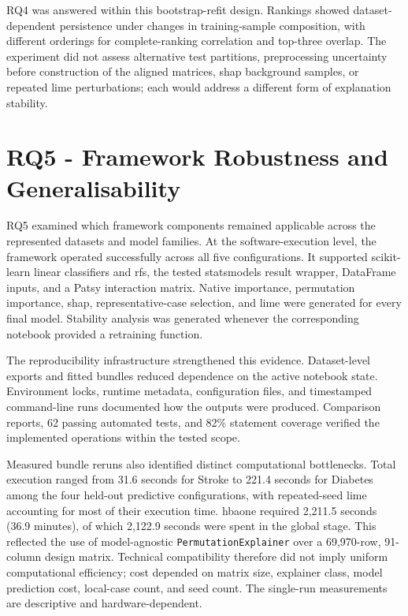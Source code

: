 RQ4 was answered within this bootstrap-refit design. Rankings showed dataset-dependent persistence under changes in training-sample composition, with different orderings for complete-ranking correlation and top-three overlap. The experiment did not assess alternative test partitions, preprocessing uncertainty before construction of the aligned matrices, \gls{shap} background samples, or repeated \gls{lime} perturbations; each would address a different form of explanation stability.

\section{RQ5 - Framework Robustness and Generalisability}

RQ5 examined which framework components remained applicable across the represented datasets and model families. At the software-execution level, the framework operated successfully across all five configurations. It supported scikit-learn linear classifiers and \glspl{rf}, the tested statsmodels result wrapper, DataFrame inputs, and a Patsy interaction matrix. Native importance, permutation importance, \gls{shap}, representative-case selection, and \gls{lime} were generated for every final model. Stability analysis was generated whenever the corresponding notebook provided a retraining function.

The reproducibility infrastructure strengthened this evidence. Dataset-level exports and fitted bundles reduced dependence on the active notebook state. Environment locks, runtime metadata, configuration files, and timestamped command-line runs documented how the outputs were produced. Comparison reports, 62 passing automated tests, and 82\% statement coverage verified the implemented operations within the tested scope.

Measured bundle reruns also identified distinct computational bottlenecks. Total execution ranged from 31.6 seconds for Stroke to 221.4 seconds for Diabetes among the four held-out predictive configurations, with repeated-seed \gls{lime} accounting for most of their execution time. \gls{hbaone} required 2,211.5 seconds (36.9 minutes), of which 2,122.9 seconds were spent in the global stage. This reflected the use of model-agnostic \texttt{PermutationExplainer} over a 69,970-row, 91-column design matrix. Technical compatibility therefore did not imply uniform computational efficiency; cost depended on matrix size, explainer class, model prediction cost, local-case count, and seed count. The single-run measurements are descriptive and hardware-dependent.

